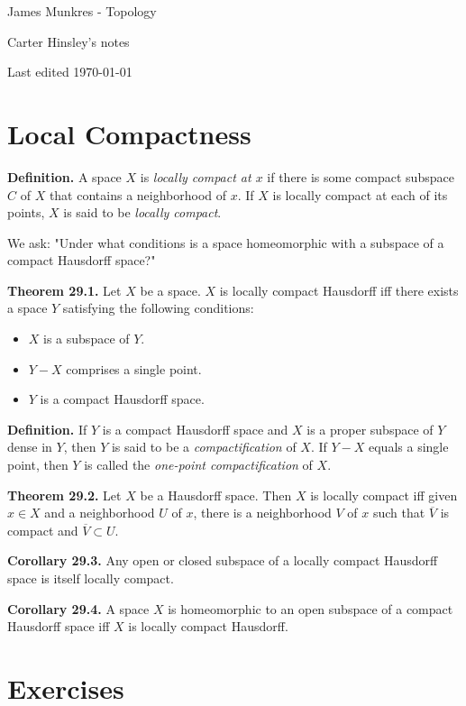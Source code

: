 \documentclass[a4paper]{article}
\begin{document}
\begin{center}
\LARGE{James Munkres - Topology}

\large{Carter Hinsley's notes}

Last edited \today
\end{center}

\setcounter{section}{28}
\section{Local Compactness}

\textbf{Definition.} A space $X$ is \emph{locally compact at $x$} if there is some compact subspace $C$ of $X$ that contains a neighborhood of $x$. If $X$ is locally compact at each of its points, $X$ is said to be \emph{locally compact}.

We ask: "Under what conditions is a space homeomorphic with a subspace of a compact Hausdorff space?"

\textbf{Theorem 29.1.} Let $X$ be a space. $X$ is locally compact Hausdorff iff there exists a space $Y$ satisfying the following conditions:
\begin{itemize}
    \item $X$ is a subspace of $Y$.
    \item $Y - X$ comprises a single point.
    \item $Y$ is a compact Hausdorff space.
\end{itemize}

\textbf{Definition.} If $Y$ is a compact Hausdorff space and $X$ is a proper subspace of $Y$ dense in $Y$, then $Y$ is said to be a \emph{compactification} of $X$. If $Y - X$ equals a single point, then $Y$ is called the \emph{one-point compactification} of $X$.

\textbf{Theorem 29.2.} Let $X$ be a Hausdorff space. Then $X$ is locally compact iff given $x \in X$ and a neighborhood $U$ of $x$, there is a neighborhood $V$ of $x$ such that $\overline{V}$ is compact and $\overline{V} \subset U$.

\textbf{Corollary 29.3.} Any open or closed subspace of a locally compact Hausdorff space is itself locally compact.

\textbf{Corollary 29.4.} A space $X$ is homeomorphic to an open subspace of a compact Hausdorff space iff $X$ is locally compact Hausdorff.

\section*{Exercises}
\end{document}
